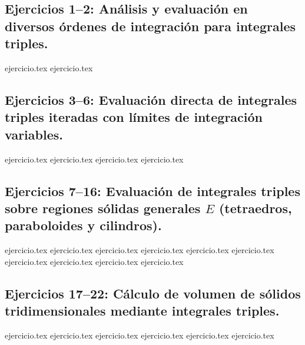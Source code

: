 
\subsection*{Ejercicios 1--2: Análisis y evaluación en diversos órdenes de integración para integrales triples.}
\begin{enumerate}
    {ejercicio.tex}
    {ejercicio.tex}
\end{enumerate}

\subsection*{Ejercicios 3--6: Evaluación directa de integrales triples iteradas con límites de integración variables.}
\begin{enumerate}
    \setcounter{enumi}{2}
    {ejercicio.tex}
    {ejercicio.tex}
    {ejercicio.tex}
    {ejercicio.tex}
\end{enumerate}

\subsection*{Ejercicios 7--16: Evaluación de integrales triples sobre regiones sólidas generales $E$ (tetraedros, paraboloides y cilindros).}
\begin{enumerate}
    \setcounter{enumi}{6}
    {ejercicio.tex}
    {ejercicio.tex}
    {ejercicio.tex}
    {ejercicio.tex}
    {ejercicio.tex}
    {ejercicio.tex}
    {ejercicio.tex}
    {ejercicio.tex}
    {ejercicio.tex}
    {ejercicio.tex}
\end{enumerate}

\subsection*{Ejercicios 17--22: Cálculo de volumen de sólidos tridimensionales mediante integrales triples.}
\begin{enumerate}
    \setcounter{enumi}{16}
    {ejercicio.tex}
    {ejercicio.tex}
    {ejercicio.tex}
    {ejercicio.tex}
    {ejercicio.tex}
    {ejercicio.tex}
\end{enumerate}

